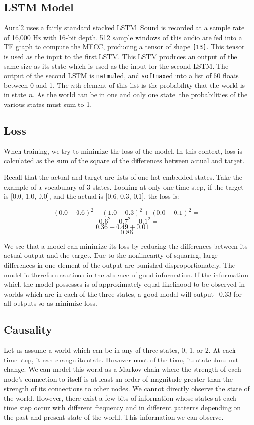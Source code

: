\documentclass[conference]{IEEEtran}
\begin{document}
\subsection{LSTM Model}
Aural2 uses a fairly standard stacked LSTM.
Sound is recorded at a sample rate of 16,000 Hz with 16-bit depth.
512 sample windows of this audio are fed into a TF graph to compute the MFCC, producing a tensor of shape \texttt{[13]}.
This tensor is used as the input to the first LSTM.
This LSTM produces an output of the same size as its state which is used as the input for the second LSTM.
The output of the second LSTM is \texttt{matmul}ed, and \texttt{softmax}ed into a list of 50 floats between 0 and 1.
The $n$th element of this list is the probability that the world is in state $n$.
As the world can be in one and only one state, the probabilities of the various states must sum to 1.

\subsection{Loss}
When training, we try to minimize the loss of the model.
In this context, loss is calculated as the sum of the square of the differences between actual and target.

Recall that the actual and target are lists of one-hot embedded states.
Take the example of a vocabulary of 3 states.
Looking at only one time step, if the target is [0.0, 1.0, 0.0], and the actual is [0.6, 0.3, 0.1], the loss is:

$$
(0.0 - 0.6) ^ 2 + (1.0 - 0.3) ^ 2 + (0.0 - 0.1) ^ 2 =
$$
$$
-0.6^2 + 0.7^2 + 0.1^2 =
$$
$$
0.36 + 0.49 + 0.01 =
$$
$$
0.86
$$

We see that a model can minimize its loss by reducing the differences between its actual output and the target.
Due to the nonlinearity of squaring, large differences in one element of the output are punished disproportionately.
The model is therefore cautious in the absence of good information.
If the information which the model possesses is of approximately equal likelihood to be observed in worlds which are in each of the three states, a good model will output ~0.33 for all outputs so as minimize loss.

\subsection{Causality}
Let us assume a world which can be in any of three states, 0, 1, or 2.
At each time step, it can change its state.
However most of the time, its state does not change.
We can model this world as a Markov chain where the strength of each node's connection to itself is at least an order of magnitude greater than the strength of its connections to other nodes.
We cannot directly observe the state of the world.
However, there exist a few bits of information whose states at each time step occur with different frequency and in different patterns depending on the past and present state of the world.
This information we can observe.
\end{document}
